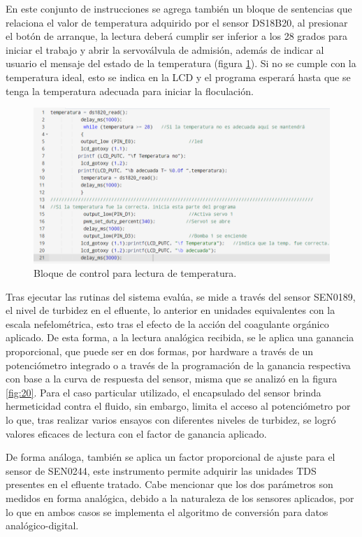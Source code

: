 \documentclass[conference]{IEEEtran}
\begin{document}
En este conjunto de instrucciones se agrega también un bloque de sentencias que relaciona el valor de temperatura adquirido por el sensor DS18B20, al presionar el botón de arranque, la lectura deberá cumplir ser inferior a los 28 grados para iniciar el trabajo y abrir la servoválvula de admisión, además de indicar al usuario el mensaje del estado de la temperatura (figura \ref{fig:19}). Si no se cumple con la temperatura ideal, esto se indica en la LCD y el programa esperará hasta que se tenga la temperatura adecuada para iniciar la floculación.

\begin{figure}[htbp]
	\centering
	\includegraphics[width=0.9\columnwidth]{fig19.png}
	\caption{Bloque de control para lectura de temperatura.}
	\label{fig:19}
\end{figure}

Tras ejecutar las rutinas del sistema evalúa, se mide a través del sensor SEN0189, el nivel de turbidez en el efluente, lo anterior en unidades equivalentes con la escala nefelométrica, esto tras el efecto de la acción del coagulante orgánico aplicado. De esta forma, a la lectura analógica recibida, se le aplica una ganancia proporcional, que puede ser en dos formas, por hardware a través de un potenciómetro integrado o a través de la programación de la ganancia respectiva con base a la curva de respuesta del sensor, misma que se analizó en la figura \ref{fig:20}. Para el caso particular utilizado, el encapsulado del sensor brinda hermeticidad contra el fluido, sin embargo, limita el acceso al potenciómetro por lo que, tras realizar varios ensayos con diferentes niveles de turbidez, se logró valores eficaces de lectura con el factor de ganancia aplicado.

De forma análoga, también se aplica un factor proporcional de ajuste para el sensor de SEN0244, este instrumento permite adquirir las unidades TDS presentes en el efluente tratado. Cabe mencionar que los dos parámetros son medidos en forma analógica, debido a la naturaleza de los sensores aplicados, por lo que en ambos casos se implementa el algoritmo de conversión para datos analógico-digital.
\end{document}
